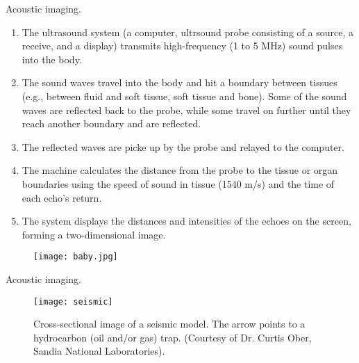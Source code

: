 
\begin{frame}
Acoustic imaging.
\begin{enumerate}
\item The ultrasound system (a computer, ultrsound probe consisting of a source, a receive, and a display) transmits high-frequency (1 to 5 MHz) sound pulses into the body.
\item The sound waves travel into the body and hit a boundary between tissues (e.g., between fluid and soft tissue, soft tissue and bone). Some of the sound waves are reflected back to the probe, while some travel on further until they reach another boundary and are reflected.
\item The reflected waves are picke up by the probe and relayed to the computer.
\item The machine calculates the distance from the probe to the tissue or organ boundaries using the speed of sound in tissue (1540 m/s) and the time of each echo's return.
\item The system displays the distances and intensities of the echoes on the screen, forming a two-dimensional image.
\end{enumerate}
\end{frame}


\begin{frame}
\begin{figure}
\texttt{[image: baby.jpg]}
\end{figure}
\end{frame}


\begin{frame}
Acoustic imaging.
\begin{figure}
\texttt{[image: seismic]}
\caption{Cross-sectional image of a seismic model. The arrow points to a hydrocarbon (oil and/or gas) trap. (Courtesy of Dr. Curtis Ober, Sandia National Laboratories).}
\end{figure}
\end{frame}


